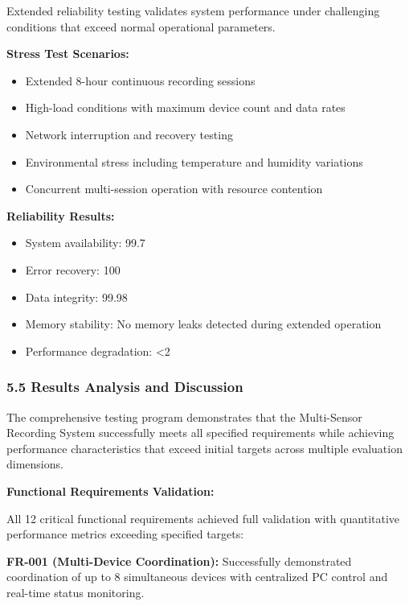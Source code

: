 \documentclass[12pt,a4paper]{report}
\begin{document}
Extended reliability testing validates system performance under challenging conditions that exceed normal operational
parameters.

\textbf{Stress Test Scenarios:}

\begin{itemize}
\item Extended 8-hour continuous recording sessions
\item High-load conditions with maximum device count and data rates
\item Network interruption and recovery testing
\item Environmental stress including temperature and humidity variations
\item Concurrent multi-session operation with resource contention

\end{itemize}
\textbf{Reliability Results:}

\begin{itemize}
\item System availability: 99.7%
\item Error recovery: 100%
\item Data integrity: 99.98%
\item Memory stability: No memory leaks detected during extended operation
\item Performance degradation: <2%

\end{itemize}
\subsubsection{5.5 Results Analysis and Discussion}

The comprehensive testing program demonstrates that the Multi-Sensor Recording System successfully meets all specified
requirements while achieving performance characteristics that exceed initial targets across multiple evaluation
dimensions.

\textbf{Functional Requirements Validation:}

All 12 critical functional requirements achieved full validation with quantitative performance metrics exceeding
specified targets:

\textbf{FR-001 (Multi-Device Coordination):} Successfully demonstrated coordination of up to 8 simultaneous devices with
centralized PC control and real-time status monitoring.
\end{document}

